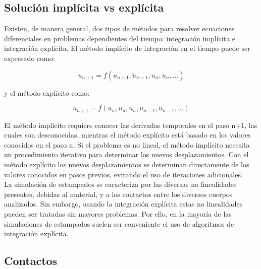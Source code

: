 

\subsection{Solución implícita vs explícita}

Existen, de manera general, dos tipos de métodos para resolver ecuaciones diferenciales  
en problemas dependientes del tiempo: integración implícita e integración explícita. El 
método implícito de integración en el tiempo puede ser expresado como: ~\cite{nielsen1997}

\begin{equation}
u_{n+1}=f(\dot{u}_{n+1},\ddot{u}_{n+1},u_n,\dot{u}_n,…)
\end{equation}

y el método explícito como:

\begin{equation}
u_{n+1}=f(u_n,\dot{u}_n,\ddot{u}_n,u_{n-1},\dot{u}_{n-1},…)
\end{equation}

El método implícito requiere conocer las derivadas temporales en el paso n+1, las cuales son desconocidas, mientras el método explícito está basado en los valores conocidos en el paso n. Si el problema es no lineal, el método implícito necesita un procedimiento iterativo para determinar los nuevos desplazamientos. Con el método explícito los nuevos desplazamientos se determinan directamente de los valores conocidos en pasos previos, evitando el uso de iteraciones adicionales.\\

La simulación de estampados se caracteriza por las diversas no linealidades presentes, debidas al material, y a los contactos entre los diversos cuerpos analizados. Sin embargo, usando la integración explícita estas no linealidades pueden ser tratadas sin mayores problemas. Por ello, en la mayoría de las simulaciones de estampados suelen ser conveniente el uso de algoritmos de integración explícita.

\subsection{Contactos}


